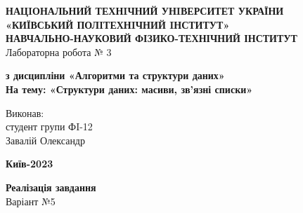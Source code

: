 \documentclass[a4paper,12pt]{article}
\begin{document}
    \begin{center}
        \hfill \break
        \large{\textbf{НАЦIОНАЛЬНИЙ ТЕХНIЧНИЙ УНIВЕРСИТЕТ УКРАЇНИ\\
                «КИЇВСЬКИЙ ПОЛIТЕХНIЧНИЙ IНСТИТУТ»\\
                НАВЧАЛЬНО-НАУКОВИЙ ФІЗИКО-ТЕХНІЧНИЙ ІНСТИТУТ}}\\
        \hfill \break \hfill \break \hfill\break \hfill \break \hfill \break \hfill \break \hfill \break
        \hfill \break \hfill \break \hfill \break \hfill \break
        \large{Лабораторна робота № 3}
        \begin{center}
            \normalsize{\textbf{з дисципліни «Алгоритми та структури даних» \\
            На тему: «Структури даних: масиви, зв’язні списки» \\}}
        \end{center}
    \end{center}
    \hfill \break \hfill \break \hfill \break \hfill \break \hfill \break \hfill \break \hfill \break
    \hfill \break \hfill \break \hfill \break \hfill \break \hfill \break \hfill \break 
    \begin{flushright}
        \large{ \hspace{35pt} Виконав:\\
            студент групи ФI-12\\
            Завалій Олександр} 
    \end{flushright}
    \hfill \break \hfill \break \hfill \break \hfill \break \hfill \break \hfill \break \hfill \break
    \hfill \break
    \begin{center} \textbf{Київ-2023} \end{center}
    \thispagestyle{empty}

\newpage
    \begin{center}
        \Large{\bfseries{Реалізація завдання}} \\
        \Large{Варіант №5}
    \end{center}
\end{document}
